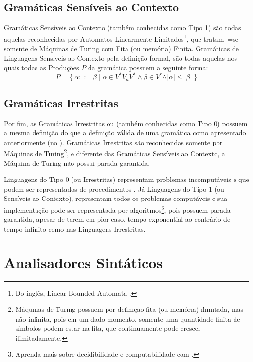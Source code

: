 \subsection{Gramáticas Sensíveis ao Contexto}

    Gramáticas Sensíveis ao Contexto (também conhecidas como Tipo 1) são todas aquelas reconhecidas por Automatos Linearmente Limitados\footnote{
    Do inglês,
    Linear Bounded Automata \cite{fundamentalsOfTheoreticalComputerScience}.
    },
    que tratam~=se somente de Máquinas de Turing \cite{sipserBook} com Fita (ou memória) Finita.
    Gramáticas de Linguagens Sensíveis ao Contexto pela definição formal,
    são todas aquelas nos quais todas as Produções $P$ da gramática possuem a seguinte forma:
    $$ P = \{\; \alpha ::= \beta \;|\; \alpha \in V^* V_n V^* \land \beta \in V^*
                \land \vert\alpha\vert \leq \vert\beta\vert \;\} $$


\subsection{Gramáticas Irrestritas}

    Por fim,
    as Gramáticas Irrestritas ou (também conhecidas como Tipo 0) possuem a mesma definição do
    que a definição válida de uma gramática como apresentado anteriormente (no
    ).
    Gramáticas Irrestritas são reconhecidas somente por Máquinas de Turing\footnote{
    Máquinas de Turing possuem por definição fita (ou memória) ilimitada,
    mas não infinita,
    pois em um dado momento,
    somente uma quantidade finita de símbolos podem estar na fita,
    que continuamente pode crescer ilimitadamente.
    },
    e diferente das Gramáticas Sensíveis ao Contexto,
    a Máquina de Turing não possui parada garantida.

    Linguagens do Tipo 0 (ou Irrestritas) representam problemas incomputáveis e
    que podem ser representados de procedimentos \cite{sipserBook}.
    Já Linguagens do Tipo 1 (ou Sensíveis ao Contexto),
    representam todos os problemas computáveis e
    sua implementação pode ser representada por algoritmos\footnote{
    Aprenda mais sobre decidibilidade e
    computabilidade com .
    },
    pois possuem parada garantida,
    apesar de terem em pior caso,
    tempo exponential ao contrário de tempo infinito como nas Linguagens Irrestritas.


\section{Analisadores Sintáticos}
\label{analisadoresSintaticos}

